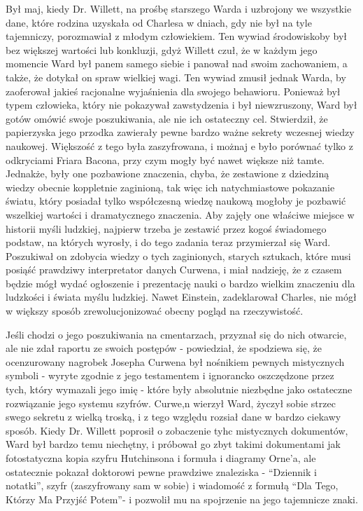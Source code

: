 Był maj, kiedy Dr. Willett, na prośbę starszego Warda i uzbrojony we wszystkie dane, które rodzina uzyskała od Charlesa w dniach, gdy nie był na tyle tajemniczy, porozmawiał z młodym człowiekiem. Ten wywiad środowiskoby był bez większej wartości lub konkluzji, gdyż Willett czuł, że w każdym jego momencie Ward był panem samego siebie i panował nad swoim zachowaniem, a także, że dotykał on spraw wielkiej wagi. Ten wywiad zmusił jednak Warda, by zaoferował jakieś racjonalne wyjaśnienia dla swojego behawioru. Ponieważ był typem człowieka, który nie pokazywał zawstydzenia i był niewzruszony, Ward był gotów omówić swoje poszukiwania, ale nie ich ostateczny cel. Stwierdził, że papierzyska jego przodka zawierały pewne bardzo ważne sekrety wczesnej wiedzy naukowej. Większość z tego była zaszyfrowana, i możnaj e było porównać tylko z odkryciami Friara Bacona, przy czym mogły być nawet większe niż tamte. Jednakże, były one pozbawione znaczenia, chyba, że zestawione z dziedziną wiedzy obecnie koppletnie zaginioną, tak więc ich natychmiastowe pokazanie światu, który posiadał tylko współczesną wiedzę naukową mogłoby je pozbawić wszelkiej wartości i dramatycznego znaczenia. Aby zajęły one właściwe miejsce w historii myśli ludzkiej, najpierw trzeba je zestawić przez kogoś świadomego podstaw, na których wyrosły, i do tego zadania teraz przymierzał się Ward. Poszukiwał on zdobycia wiedzy o tych zaginionych, starych sztukach, które musi posiąść prawdziwy interpretator danych Curwena, i miał nadzieję, że z czasem będzie mógł wydać ogłoszenie i prezentację nauki o bardzo wielkim znaczeniu dla ludzkości i świata myślu ludzkiej. Nawet Einstein, zadeklarował Charles, nie mógł w większy sposób zrewolucjonizować obecny pogląd na rzeczywistość. 

Jeśli chodzi o jego poszukiwania na cmentarzach, przyznał się do nich otwarcie, ale nie zdał raportu ze swoich postępów - powiedział, że spodziewa się, że ocenzurowany nagrobek Josepha Curwena był nośnikiem pewnych mistycznych symboli - wyryte zgodnie z jego testamentem i ignorancko oszczędzone przez tych, który wymazali jego imię - które były absolutnie niezbędne jako ostateczne rozwiązanie jego systemu szyfrów. Curwe,n wierzył Ward, życzył sobie strzec swego sekretu z wielką troską, i z tego względu rozsiał dane w bardzo ciekawy sposób. Kiedy Dr. Willett poprosił o zobaczenie tyhc mistycznych dokumentów, Ward był bardzo temu niechętny, i próbował go zbyt takimi dokumentami jak fotostatyczna kopia szyfru Hutchinsona i formuła i diagramy Orne'a, ale ostatecznie pokazał doktorowi pewne prawdziwe znaleziska - ``Dziennik i notatki'', szyfr (zaszyfrowany sam w sobie) i wiadomość z formułą ``Dla Tego, Którzy Ma Przyjść Potem''- i pozwolił mu na spojrzenie na jego tajemnicze znaki. 

